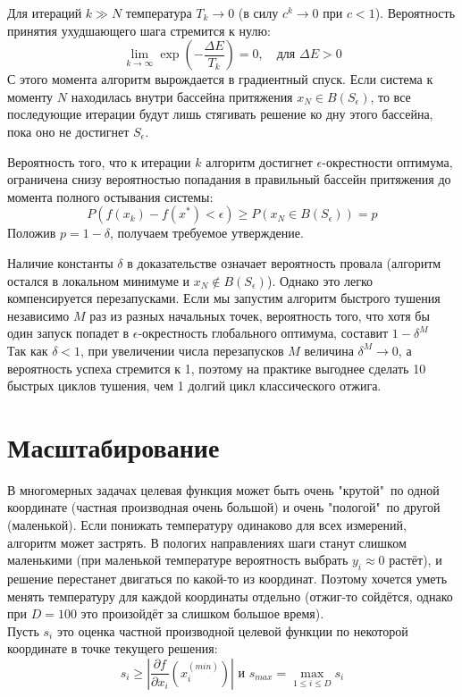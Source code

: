 Для итераций $k \gg N$ температура $T_k \to 0$ (в силу $c^k \to 0$ при $c < 1$). Вероятность принятия ухудшающего шага стремится к нулю:
$$\lim_{k \to \infty} \exp\left(-\frac{\Delta E}{T_k}\right) = 0, \quad \text{для } \Delta E > 0$$
С этого момента алгоритм вырождается в градиентный спуск. Если система к моменту $N$ находилась внутри бассейна притяжения $x_N \in B(S_\epsilon)$, то все последующие итерации будут лишь стягивать решение ко дну этого бассейна, пока оно не достигнет $S_\epsilon$.

Вероятность того, что к итерации $k$ алгоритм достигнет $\epsilon$-окрестности оптимума, ограничена снизу вероятностью попадания в правильный бассейн притяжения до момента полного остывания системы:
$$P(f(x_k) - f(x^*) < \epsilon) \ge P(x_N \in B(S_\epsilon)) = p$$
Положив $p = 1 - \delta$, получаем требуемое утверждение.

Наличие константы $\delta$ в доказательстве означает вероятность провала (алгоритм остался в локальном минимуме и $x_N \notin B(S_\epsilon)$). Однако это легко компенсируется перезапусками. Если мы запустим алгоритм быстрого тушения независимо $M$ раз из разных начальных точек, вероятность того, что хотя бы один запуск попадет в $\epsilon$-окрестность глобального оптимума, составит $ 1 - \delta^M $ \\
Так как $\delta < 1$, при увеличении числа перезапусков $M$ величина $\delta^M \to 0$, а вероятность успеха стремится к 1, поэтому на практике выгоднее сделать 10 быстрых циклов тушения, чем 1 долгий цикл классического отжига.
\section{Масштабирование}
В многомерных задачах целевая функция может быть очень "крутой"\, по одной координате (частная производная очень большой) и очень "пологой"\, по другой (маленькой). Если понижать температуру  одинаково для всех измерений, алгоритм может застрять. В пологих направлениях шаги станут слишком маленькими (при маленькой температуре вероятность выбрать $y_i \approx 0$ растёт), и решение перестанет двигаться по какой-то из координат. Поэтому хочется уметь менять температуру для каждой координаты отдельно (отжиг-то сойдётся, однако при $D=100$ это произойдёт за слишком большое время). \\

\noindent Пусть $s_i$ это оценка частной производной целевой функции по некоторой координате в точке текущего решения: $$s_i \geq \left|\frac{\partial f}{\partial x_i}(x_i^{(min)}) \right| \text{ и } s_{max} = \max_{1\leq i \leq D}s_i$$ 

